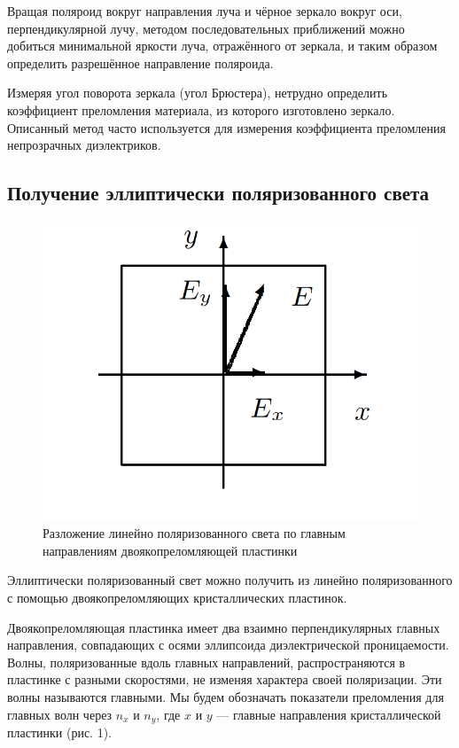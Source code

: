 \documentclass[a4paper, 12pt]{article}%
\begin{document}
Вращая поляроид вокруг направления луча и чёрное зеркало вокруг
оси, перпендикулярной лучу, методом последовательных приближений
можно добиться минимальной яркости луча, отражённого от зеркала,
и таким образом определить разрешённое направление поляроида.

Измеряя угол поворота зеркала (угол Брюстера), нетрудно определить коэффициент преломления материала, из которого изготовлено
зеркало. Описанный метод часто используется для измерения коэффициента преломления непрозрачных диэлектриков.

\subsection{Получение эллиптически поляризованного света}
\begin{figure} 
	\includegraphics[width=\linewidth]{images/1.png}
	\caption{Разложение линейно поляризованного света по главным направлениям двоякопреломляющей пластинки}
	\label{ris 1}
\end{figure}

Эллиптически поляризованный свет можно получить из линейно поляризованного с
помощью двоякопреломляющих кристаллических пластинок.

Двоякопреломляющая пластинка имеет два взаимно перпендикулярных главных направления, совпадающих с осями эллипсоида диэлектрической проницаемости. Волны, поляризованные вдоль главных направлений, распространяются в пластинке с разными скоростями, не изменяя характера своей поляризации. Эти волны называются главными. Мы будем обозначать показатели преломления для главных волн через $ n_x $ и $ n_y $, где $ x $ и $ y $ --- главные направления кристаллической пластинки (рис. 1).
\end{document}
